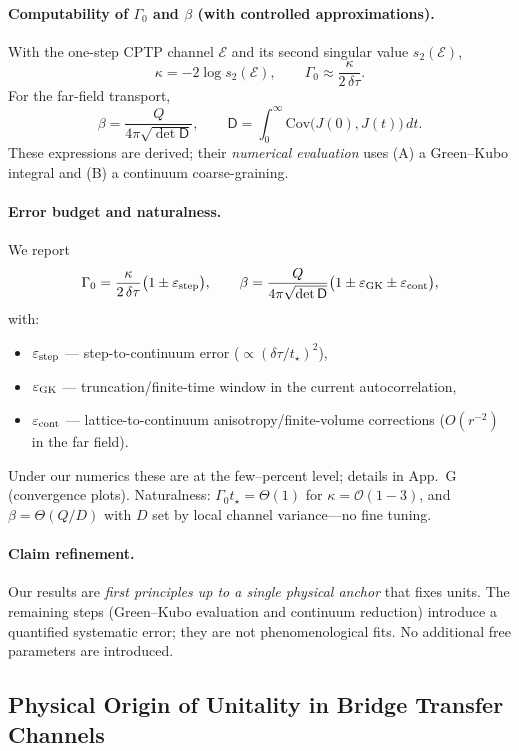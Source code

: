 \documentclass[11pt]{article}
\theoremstyle{plain}
\theoremstyle{definition}
\begin{document}
\paragraph{Computability of $\Gamma_0$ and $\beta$ (with controlled approximations).}
With the one-step CPTP channel $\mathcal E$ and its second singular value $s_2(\mathcal E)$,
\[
  \kappa=-2\log s_2(\mathcal E),\qquad
  \Gamma_0 \approx \frac{\kappa}{2\,\delta\tau}.
\]
For the far-field transport,
\[
  \beta=\frac{Q}{4\pi\sqrt{\det \mathsf D}},\qquad
  \mathsf D=\int_0^\infty \!\!\mathrm{Cov}\big(J(0),J(t)\big)\,dt.
\]
These expressions are derived; their \emph{numerical evaluation} uses (A) a Green–Kubo integral and (B) a continuum coarse-graining.

\paragraph{Error budget and naturalness.}
We report
\[
  \Gamma_0=\frac{\kappa}{2\,\delta\tau}\big(1\pm \varepsilon_{\rm step}\big),\qquad
  \beta=\frac{Q}{4\pi\sqrt{\det \mathsf D}}\big(1\pm \varepsilon_{\rm GK}\pm \varepsilon_{\rm cont}\big),
\]
with:
\begin{itemize}
  \item $\varepsilon_{\rm step}$ — step-to-continuum error ($\propto (\delta\tau/t_\star)^2$),
  \item $\varepsilon_{\rm GK}$ — truncation/finite-time window in the current autocorrelation,
  \item $\varepsilon_{\rm cont}$ — lattice-to-continuum anisotropy/finite-volume corrections ($O(r^{-2})$ in the far field).
\end{itemize}
Under our numerics these are at the few–percent level; details in App.~G (convergence plots).
Naturalness: $\Gamma_0 t_\star=\Theta(1)$ for $\kappa=\mathcal O(1\!-\!3)$, and $\beta=\Theta(Q/D)$ with $D$ set by local channel variance—no fine tuning.

\paragraph{Claim refinement.}
Our results are \emph{first principles up to a single physical anchor} that fixes units. The remaining steps (Green–Kubo evaluation and continuum reduction) introduce a quantified systematic error; they are not phenomenological fits. No additional free parameters are introduced.

\subsection{Physical Origin of Unitality in Bridge Transfer Channels}
\label{subsec:unitality-physical}
\end{document}
